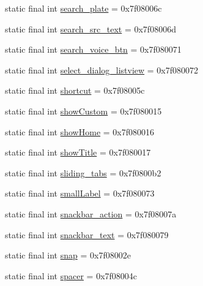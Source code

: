 \begin{CompactItemize}
static final int \hyperlink{classandroid_1_1support_1_1transition_1_1_r_1_1id_d48a3dae9de898922da42a287352c5a8}{search\_\-plate} = 0x7f08006c
\item 
static final int \hyperlink{classandroid_1_1support_1_1transition_1_1_r_1_1id_46cac1df9dc0b4048abbef0a2536b800}{search\_\-src\_\-text} = 0x7f08006d
\item 
static final int \hyperlink{classandroid_1_1support_1_1transition_1_1_r_1_1id_9650e37b3fdd4c6aab954d103faf58c3}{search\_\-voice\_\-btn} = 0x7f080071
\item 
static final int \hyperlink{classandroid_1_1support_1_1transition_1_1_r_1_1id_efe9fc3985af692f558a7a18a7f71537}{select\_\-dialog\_\-listview} = 0x7f080072
\item 
static final int \hyperlink{classandroid_1_1support_1_1transition_1_1_r_1_1id_af0ccca66a227a14dcb7e8b0c526855f}{shortcut} = 0x7f08005c
\item 
static final int \hyperlink{classandroid_1_1support_1_1transition_1_1_r_1_1id_ce880811cdd6dede0fdd38adbd644715}{showCustom} = 0x7f080015
\item 
static final int \hyperlink{classandroid_1_1support_1_1transition_1_1_r_1_1id_c00b60f21b6b5d9c198e6592a1f799d6}{showHome} = 0x7f080016
\item 
static final int \hyperlink{classandroid_1_1support_1_1transition_1_1_r_1_1id_3796b646cd311c20e41d3346c6e449e5}{showTitle} = 0x7f080017
\item 
static final int \hyperlink{classandroid_1_1support_1_1transition_1_1_r_1_1id_5b8d4eda0b9d8f8a6752462f43d88103}{sliding\_\-tabs} = 0x7f0800b2
\item 
static final int \hyperlink{classandroid_1_1support_1_1transition_1_1_r_1_1id_6331a977f94bc8799197ce713e17f8a1}{smallLabel} = 0x7f080073
\item 
static final int \hyperlink{classandroid_1_1support_1_1transition_1_1_r_1_1id_86ef3bb84ab55ce109cd20a362c0f2cd}{snackbar\_\-action} = 0x7f08007a
\item 
static final int \hyperlink{classandroid_1_1support_1_1transition_1_1_r_1_1id_b27c1397cc5de738496c254dd92a8ee5}{snackbar\_\-text} = 0x7f080079
\item 
static final int \hyperlink{classandroid_1_1support_1_1transition_1_1_r_1_1id_8f7a3aa96016179fae10d8b453ce98c2}{snap} = 0x7f08002e
\item 
static final int \hyperlink{classandroid_1_1support_1_1transition_1_1_r_1_1id_e9dbb5b8843146dbfe9187bf280eaf08}{spacer} = 0x7f08004c
\item 

\end{CompactItemize}
